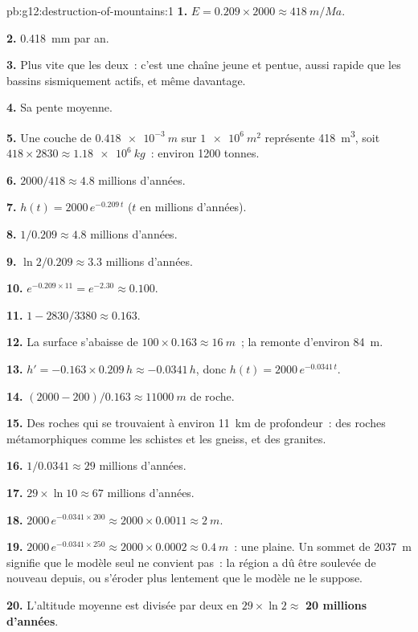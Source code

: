 \begin{solution}{pb:g12:destruction-of-mountains:1}
\textbf{1.} $E = 0.209 \times 2000 \approx \qty{418}{m/Ma}$.

\textbf{2.} \qty{0.418}{mm} par an.

\textbf{3.} Plus vite que les deux~: c'est une chaîne jeune et pentue,
aussi rapide que les bassins sismiquement actifs, et même davantage.

\textbf{4.} Sa pente moyenne.

\textbf{5.} Une couche de $\qty{0.418e-3}{m}$ sur $\qty{1e6}{m^2}$
représente \qty{418}{m^3}, soit $418 \times 2830 \approx \qty{1.18e6}{kg}$~:
environ 1200 tonnes.

\textbf{6.} $2000/418 \approx 4.8$ millions d'années.

\textbf{7.} $h(t) = 2000\,e^{-0.209\,t}$ ($t$ en millions d'années).

\textbf{8.} $1/0.209 \approx 4.8$ millions d'années.

\textbf{9.} $\ln 2/0.209 \approx 3.3$ millions d'années.

\textbf{10.} $e^{-0.209 \times 11} = e^{-2.30} \approx 0.100$.

\textbf{11.} $1 - 2830/3380 \approx 0.163$.

\textbf{12.} La surface s'abaisse de $100 \times 0.163 \approx \qty{16}{m}$~;
la  remonte d'environ \qty{84}{m}.

\textbf{13.} $h' = -0.163 \times 0.209\,h \approx -0.0341\,h$, donc $h(t) =
2000\,e^{-0.0341\,t}$.

\textbf{14.} $(2000 - 200)/0.163 \approx \qty{11000}{m}$ de roche.

\textbf{15.} Des roches qui se trouvaient à environ \qty{11}{km} de
profondeur~: des roches métamorphiques comme les schistes et les gneiss, et
des granites.

\textbf{16.} $1/0.0341 \approx 29$ millions d'années.

\textbf{17.} $29 \times \ln 10 \approx 67$ millions d'années.

\textbf{18.} $2000\,e^{-0.0341 \times 200} \approx 2000 \times 0.0011 \approx
\qty{2}{m}$.

\textbf{19.} $2000\,e^{-0.0341 \times 250} \approx 2000 \times 0.0002 \approx
\qty{0.4}{m}$~: une plaine. Un sommet de \qty{2037}{m} signifie que le
modèle seul ne convient pas~: la région a dû être soulevée de nouveau
depuis, ou s'éroder plus lentement que le modèle ne le suppose.

\textbf{20.} L'altitude moyenne est divisée par deux en $29 \times \ln 2 \approx$
\textbf{20 millions d'années}.
\end{solution}
